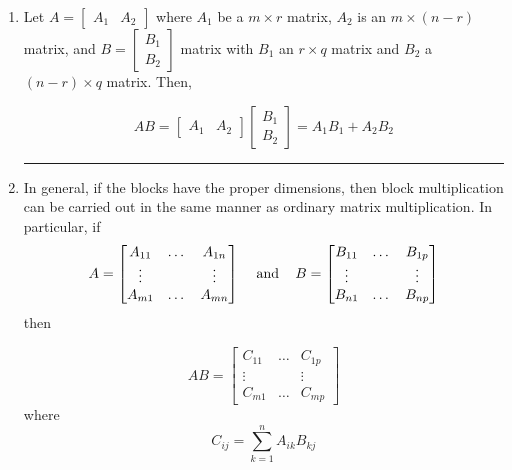 \begin{enumerate}
	
	\item Let $A = \begin{bmatrix} A_1 & A_2 \end{bmatrix}$ where $A_1$ be  a $m \times r$ matrix,  $A_2$ is an $m \times (n - r)$ matrix, and $B = \begin{bmatrix} B_1 \\ B_2 \end{bmatrix}$ matrix with $B_1$ an $r \times q$ matrix and $B_2$ a $(n - r) \times q$ matrix.  Then,     
	
		\begin{tcolorbox}[colback=yellow!10!,colframe=gray!15!]
$$AB = \begin{bmatrix} A_1 & A_2 \end{bmatrix} \begin{bmatrix} B_1 \\ B_2 \end{bmatrix} = A_1B_1 +  A_2B_2$$
	\end{tcolorbox}



\rule[0.01in]{\textwidth}{0.0025in}





\item In general, if the blocks have the proper dimensions, then block multiplication can be carried out in the same manner as ordinary  matrix multiplication.  In particular, if
\[ A =  \begin{bmatrix}  A_{11} & \dots & A_{1n}\\ \vdots & & \vdots \\ A_{m1} & \dots & A_{mn} \end{bmatrix}  \text{\;\;\; and \;\;\;} B =  \begin{bmatrix}  B_{11} & \dots & B_{1p}\\ \vdots & & \vdots \\ B_{n1} & \dots & B_{np} \end{bmatrix}  \]
then
		\begin{tcolorbox}[colback=yellow!10!,colframe=gray!15!]

\[ AB =  \begin{bmatrix}  C_{11} & \dots & C_{1p}\\ \vdots & & \vdots \\ C_{m1} & \dots & C_{mp} \end{bmatrix} \]
where
\[   C_{ij} = \sum_{k=1}^n  A_{ik}B_{kj} \]
	\end{tcolorbox}




\end{enumerate}
